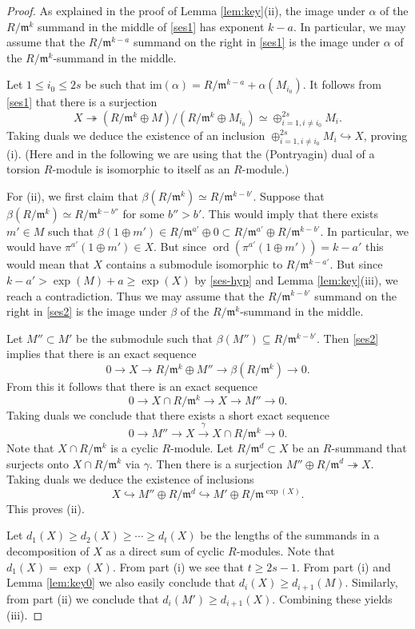 \documentclass[10pt]{amsart}
\numberwithin{equation}{section}
\theoremstyle{definition}
\theoremstyle{remark}
\newcommand{\fm}{\mathfrak{m}}
\DeclareMathOperator{\ord}{ord}
\begin{document}
\begin{proof} 
As explained in the proof of Lemma \ref{lem:key}(ii),
 the image under $\alpha$ of the $R/\fm^k$ summand in the middle of \eqref{ses1} has exponent $k-a$.
In particular, we may assume that the $R/\fm^{k-a}$ summand on the right in \eqref{ses1} 
is the image under $\alpha$ of the $R/\fm^k$-summand in the middle.

Let $1\leqslant i_0\leqslant 2s$ be such that $\mathrm{im}(\alpha) = R/\fm^{k-a}+\alpha(M_{i_0})$. 
It follows from \eqref{ses1} that there is a surjection
$$
X\twoheadrightarrow (R/\fm^k\oplus M)/(R/\fm^k\oplus M_{i_0})\simeq \oplus_{i=1, i\neq i_0}^{2s} M_i.
$$
Taking duals we deduce the existence of an inclusion
$\oplus_{i=1, i\neq i_0}^{2s} M_i \hookrightarrow X$,
proving (i). (Here and in the following we are using that the (Pontryagin) dual of a torsion $R$-module is
isomorphic to itself as an $R$-module.)

For (ii), we first claim that $\beta(R/\fm^k) \simeq R/\fm^{k-b'}$. Suppose
that $\beta(R/\fm^k) \simeq R/\fm^{k-b''}$ for some $b''>b'$. This would imply that there exists $m'\in M$ such that
$\beta(1\oplus m' ) \in R/\fm^{a'}\oplus 0 \subset R/\fm^{a'}\oplus R/\fm^{k-b'}$. In particular, we would have
 $\pi^{a'}(1\oplus m') \in X$. But since $\ord(\pi^{a'}(1\oplus m')) = k-a'$ this would mean that $X$ contains
 a submodule isomorphic to $R/\fm^{k-a'}$. 
 But since $k-a'> \exp(M)+a \geqslant \exp(X)$ by  \eqref{ses-hyp} and Lemma \ref{lem:key}(iii), we reach a contradiction. 
Thus we may assume that 
the $R/\fm^{k-b'}$ summand on the right in \eqref{ses2} 
is the image under $\beta$ of the $R/\fm^k$-summand in the middle. 

Let $M''\subset M'$ be the submodule such that $\beta(M'')\subseteq R/\fm^{k-b'}$. 
Then \eqref{ses2} implies that there is an exact sequence
$$
0\rightarrow X \rightarrow R/\fm^k \oplus M'' \rightarrow \beta(R/\fm^k)\rightarrow 0.
$$
From this it follows that there is an exact sequence
$$
0\rightarrow X\cap R/\fm^k \rightarrow X \rightarrow M'' \rightarrow 0.
$$
Taking duals we conclude that there exists a short exact sequence
$$
0 \rightarrow M'' \rightarrow X \xrightarrow{\gamma} X\cap R/\fm^k \rightarrow 0.
$$
Note that $X\cap R/\fm^k$ is a cyclic $R$-module. 
Let $R/\fm^{d} \subset X$ be an $R$-summand that surjects
onto $X\cap R/\fm^k$ via $\gamma$. Then there is a surjection
$M''\oplus R/\fm^{d}\twoheadrightarrow X$.
Taking duals we deduce the existence of inclusions
$$
X\hookrightarrow M'' \oplus R/\fm^d \hookrightarrow M'\oplus R/\fm^{\exp(X)}.
$$
This proves (ii).

Let 
$d_1(X) \geqslant d_2(X) \geqslant \cdots \geqslant d_{t}(X)$
be the lengths of the summands in a decomposition of $X$ as a direct sum of cyclic $R$-modules.
Note that $d_1(X)=\exp(X)$. From part (i) we see that $t\geqslant 2s-1$.
From part (i) and Lemma \ref{lem:key0} we also easily conclude that $d_i(X) \geqslant d_{i+1}(M)$.
Similarly, from part (ii) we conclude that $d_i(M') \geqslant d_{i+1}(X)$. Combining these yields (iii).
\end{proof}
\end{document}
